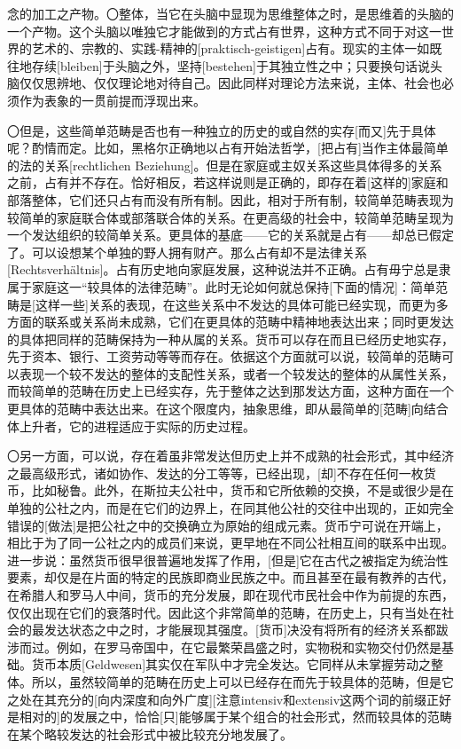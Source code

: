 \documentclass[a5paper,twoside,10.5pt]{ctexart}
\begin{document}
念的加工之产物。〇整体，当它在头脑中显现为思维整体之时，是思维着的头脑的一个产物。这个头脑以唯独它才能做到的方式占有世界，这种方式不同于对这一世界的艺术的、宗教的、实践-精神的[praktisch-geistigen]占有。现实的主体一如既往地存续[bleiben]于头脑之外，坚持[bestehen]于其独立性之中；只要换句话说头脑仅仅思辨地、仅仅理论地对待自己。因此同样对理论方法来说，主体、社会也必须作为表象的一贯前提而浮现出来。

〇但是，这些简单范畴是否也有一种独立的历史的或自然的实存[而又]先于具体呢？酌情而定。比如，黑格尔正确地以占有开始法哲学，[把占有]当作主体最简单的法的关系[rechtlichen Beziehung]。但是在家庭或主奴关系这些具体得多的关系之前，占有并不存在。恰好相反，若这样说则是正确的，即存在着[这样的]家庭和部落整体，它们还只占有而没有所有制。因此，相对于所有制，较简单范畴表现为较简单的家庭联合体或部落联合体的关系。在更高级的社会中，较简单范畴呈现为一个发达组织的较简单关系。更具体的基底——它的关系就是占有——却总已假定了。可以设想某个单独的野人拥有财产。那么占有却不是法律关系[Rechtsverhältnis]。占有历史地向家庭发展，这种说法并不正确。占有毋宁总是隶属于家庭这一“较具体的法律范畴”。此时无论如何就总保持[下面的情况]：简单范畴是[这样一些]关系的表现，在这些关系中不发达的具体可能已经实现，而更为多方面的联系或关系尚未成熟，它们在更具体的范畴中精神地表达出来；同时更发达的具体把同样的范畴保持为一种从属的关系。货币可以存在而且已经历史地实存，先于资本、银行、工资劳动等等而存在。依据这个方面就可以说，较简单的范畴可以表现一个较不发达的整体的支配性关系，或者一个较发达的整体的从属性关系，而较简单的范畴在历史上已经实存，先于整体之达到那发达方面，这种方面在一个更具体的范畴中表达出来。在这个限度内，抽象思维，即从最简单的[范畴]向结合体上升者，它的进程适应于实际的历史过程。

〇另一方面，可以说，存在着虽非常发达但历史上并不成熟的社会形式，其中经济之最高级形式，诸如协作、发达的分工等等，已经出现，[却]不存在任何一枚货币，比如秘鲁。此外，在斯拉夫公社中，货币和它所依赖的交换，不是或很少是在单独的公社之内，而是在它们的边界上，在同其他公社的交往中出现的，正如完全错误的[做法]是把公社之中的交换确立为原始的组成元素。货币宁可说在开端上，相比于为了同一公社之内的成员们来说，更早地在不同公社相互间的联系中出现。进一步说：虽然货币很早很普遍地发挥了作用，[但是]它在古代之被指定为统治性要素，却仅是在片面的特定的民族即商业民族之中。而且甚至在最有教养的古代，在希腊人和罗马人中间，货币的充分发展，即在现代市民社会中作为前提的东西，仅仅出现在它们的衰落时代。因此这个非常简单的范畴，在历史上，只有当处在社会的最发达状态之中之时，才能展现其强度。[货币]决没有将所有的经济关系都跋涉而过。例如，在罗马帝国中，在它最繁荣昌盛之时，实物税和实物交付仍然是基础。货币本质[Geldwesen]其实仅在军队中才完全发达。它同样从未掌握劳动之整体。所以，虽然较简单的范畴在历史上可以已经存在而先于较具体的范畴，但是它之处在其充分的[向内深度和向外广度][注意intensiv和extensiv这两个词的前缀正好是相对的]的发展之中，恰恰[只]能够属于某个组合的社会形式，然而较具体的范畴在某个略较发达的社会形式中被比较充分地发展了。
\end{document}
